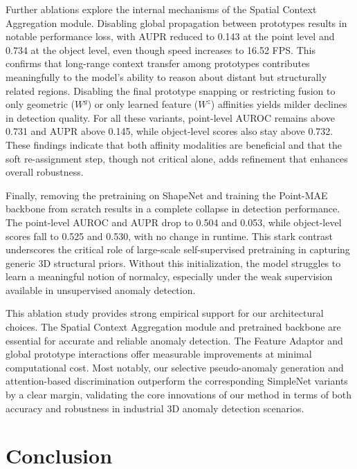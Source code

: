 Further ablations explore the internal mechanisms of the Spatial Context Aggregation module. Disabling global propagation between prototypes results in notable performance loss, with AUPR reduced to 0.143 at the point level and 0.734 at the object level, even though speed increases to 16.52 FPS. This confirms that long-range context transfer among prototypes contributes meaningfully to the model's ability to reason about distant but structurally related regions. Disabling the final prototype snapping or restricting fusion to only geometric ($W^g$) or only learned feature ($W^z$) affinities yields milder declines in detection quality. For all these variants, point-level AUROC remains above 0.731 and AUPR above 0.145, while object-level scores also stay above 0.732. These findings indicate that both affinity modalities are beneficial and that the soft re-assignment step, though not critical alone, adds refinement that enhances overall robustness.

Finally, removing the pretraining on ShapeNet and training the Point-MAE backbone from scratch results in a complete collapse in detection performance. The point-level AUROC and AUPR drop to 0.504 and 0.053, while object-level scores fall to 0.525 and 0.530, with no change in runtime. This stark contrast underscores the critical role of large-scale self-supervised pretraining in capturing generic 3D structural priors. Without this initialization, the model struggles to learn a meaningful notion of normalcy, especially under the weak supervision available in unsupervised anomaly detection.

This ablation study provides strong empirical support for our architectural choices. The Spatial Context Aggregation module and pretrained backbone are essential for accurate and reliable anomaly detection. The Feature Adaptor and global prototype interactions offer measurable improvements at minimal computational cost. Most notably, our selective pseudo-anomaly generation and attention-based discrimination outperform the corresponding SimpleNet variants by a clear margin, validating the core innovations of our method in terms of both accuracy and robustness in industrial 3D anomaly detection scenarios.

\section{Conclusion}


